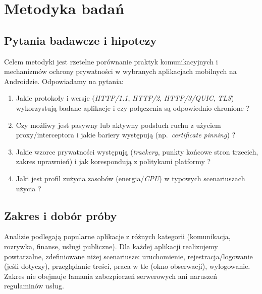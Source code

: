 \chapter{Metodyka badań}

\section{Pytania badawcze i hipotezy}
Celem metodyki jest rzetelne porównanie praktyk komunikacyjnych i mechanizmów ochrony prywatności w wybranych aplikacjach mobilnych na Androidzie. Odpowiadamy na pytania:
\begin{enumerate}
  \item Jakie protokoły i wersje (\emph{HTTP/1.1}, \emph{HTTP/2}, \emph{HTTP/3/QUIC}, \emph{TLS}) wykorzystują badane aplikacje i czy połączenia są odpowiednio chronione \cite{RFC8446,RFC9113,RFC9114,RFC9000}?
  \item Czy możliwy jest pasywny lub aktywny podsłuch ruchu z użyciem proxy/interceptora i jakie bariery występują (np.\ \emph{certificate pinning}) \cite{OWASPMASTGIntercept,OWASPMASTGPinning,MitmproxyDocs}?
  \item Jakie wzorce prywatności występują (\emph{trackery}, punkty końcowe stron trzecich, zakres uprawnień) i jak korespondują z politykami platformy \cite{ExodusPrivacy,AndroidPermissionsOverview,PrivacySandboxAndroid}?
  \item Jaki jest profil zużycia zasobów (energia/\emph{CPU}) w typowych scenariuszach użycia \cite{BatteryHistorian,AndroidProfiler}?
\end{enumerate}

\section{Zakres i dobór próby}
Analizie podlegają popularne aplikacje z różnych kategorii (komunikacja, rozrywka, finanse, usługi publiczne). Dla każdej aplikacji realizujemy powtarzalne, zdefiniowane niżej scenariusze: uruchomienie, rejestracja/logowanie (jeśli dotyczy), przeglądanie treści, praca w tle (okno obserwacji), wylogowanie. Zakres nie obejmuje łamania zabezpieczeń serwerowych ani naruszeń regulaminów usług.

